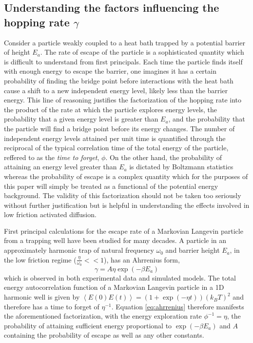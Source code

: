 \documentclass{article}
\begin{document}
\subsection{Understanding the factors influencing the hopping rate $\gamma$}

Consider a particle weakly coupled to a heat bath trapped by a potential barrier of height $E_a$. The rate of escape of the particle is a sophisticated quantity which is difficult to understand from first principals. Each time the particle finds itself with enough energy to escape the barrier, one imagines it has a certain probability of finding the bridge point before interactions with the heat bath cause a shift to a new independent energy level, likely less than the barrier energy. This line of reasoning justifies the factorization of the hopping rate into the product of the rate at which the particle explores energy levels, the probability that a given energy level is greater than $E_a$, and the probability that the particle will find a bridge point before its energy changes. The number of independent energy levels attained per unit time is quantified through the reciprocal of the typical correlation time of the total energy of the particle, reffered to as the \emph{time to forget}, $\phi$. On the other hand, the probability of attaining an energy level greater than $E_a$ is dictated by Boltzmann statistics whereas the probability of escape is a complex quantity which for the purposes of this paper will simply be treated as a functional of the potential energy background. The validity of this factorization should not be taken too seriously without further justification but is helpful in understanding the effects involved in low friction activated diffusion. 

First principal calculations for the escape rate of a Markovian Langevin particle from a trapping well have been studied for many decades. A particle in an approximately harmonic trap of natural frequency $\omega_0$ and barrier height $E_a$, in the low friction regime ($\frac{\eta}{\omega_0} << 1$), has an Ahrrenius form,
\begin{equation}
	\gamma = A \eta \exp\left(-\beta E_a \right)
	\label{eq:ahrrenius}
\end{equation}
which is observed in both experimental data and simulated models. The total energy autocorrelation function of a Markovian Langevin particle in a 1D harmonic well is given by $\left<E(0)E(t)\right> = (1 + \exp(-\eta t)) (k_BT)^2$ and therefore has a time to forget of $\eta^{-1}$. Equation \ref{eq:ahrrenius} therefore manifests the aforementioned factorization, with the energy exploration rate $\phi^{-1}=\eta$, the probability of attaining sufficient energy proportional to $\exp(-\beta E_a)$ and $A$ containing the probability of escape as well as any other constants.
\end{document}
